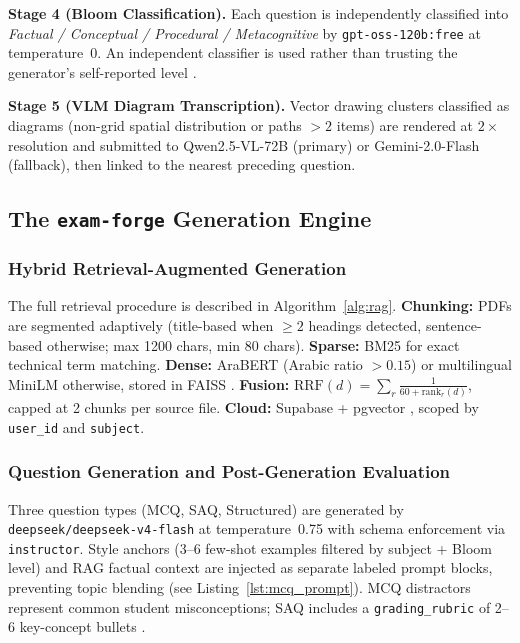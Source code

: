 \textbf{Stage 4 (Bloom Classification).}
Each question is independently classified into
\textit{Factual / Conceptual / Procedural / Metacognitive}
by \texttt{gpt-oss-120b:free} at temperature~0.
An independent classifier is used rather than trusting the generator's
self-reported level \cite{meissner2024itemforge}.

\textbf{Stage 5 (VLM Diagram Transcription).}
Vector drawing clusters classified as diagrams (non-grid spatial distribution
or paths $>2$ items) are rendered at $2\times$ resolution and submitted to
Qwen2.5-VL-72B \cite{qwen2025vl} (primary) or Gemini-2.0-Flash \cite{google2024gemini}
(fallback), then linked to the nearest preceding question.

\subsection{The \texttt{exam-forge} Generation Engine}
\label{subsec:examforge}

\subsubsection{Hybrid Retrieval-Augmented Generation}

The full retrieval procedure is described in Algorithm~\ref{alg:rag}.
\textbf{Chunking:} PDFs are segmented adaptively (title-based when $\geq 2$ headings
detected, sentence-based otherwise; max 1200 chars, min 80 chars).
\textbf{Sparse:} BM25 \cite{robertson2009bm25} for exact technical term matching.
\textbf{Dense:} AraBERT \cite{antoun2020arabert} (Arabic ratio $> 0.15$) or
multilingual MiniLM \cite{reimers2019sentence} otherwise, stored in FAISS
\cite{faiss2019}.
\textbf{Fusion:}
$\mathrm{RRF}(d) = \sum_{r} \frac{1}{60 + \mathrm{rank}_r(d)}$,
capped at 2 chunks per source file.
\textbf{Cloud:} Supabase \cite{supabase2023} + pgvector \cite{pgvector2024},
scoped by \texttt{user\_id} and \texttt{subject}.

\subsubsection{Question Generation and Post-Generation Evaluation}

Three question types (MCQ, SAQ, Structured) are generated by
\texttt{deepseek/deepseek-v4-flash} \cite{deepseek2024} at temperature~0.75
with schema enforcement via \texttt{instructor}.
Style anchors (3--6 few-shot examples filtered by subject + Bloom level) and RAG
factual context are injected as separate labeled prompt blocks, preventing topic
blending (see Listing~\ref{lst:mcq_prompt}).
MCQ distractors represent common student misconceptions; SAQ includes a
\texttt{grading\_rubric} of 2--6 key-concept bullets \cite{morris2024aqg}.

